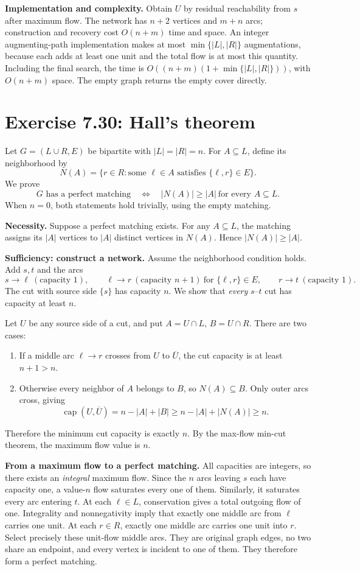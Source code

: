 \documentclass[11pt]{article}
\newcommand{\exercise}[2]{\section*{Exercise #1: #2}}
\newcommand{\capc}{\operatorname{cap}}
\begin{document}
\textbf{Implementation and complexity.}
Obtain $U$ by residual reachability from $s$ after maximum flow.
The network has $n+2$ vertices and $m+n$ arcs; construction and
recovery cost $O(n+m)$ time and space.
An integer augmenting-path implementation makes at most
$\min\{|L|,|R|\}$ augmentations, because each adds at least one unit
and the total flow is at most this quantity. Including the final search,
the time is $O((n+m)(1+\min\{|L|,|R|\}))$, with $O(n+m)$ space.
The empty graph returns the empty cover directly.

\newpage
\exercise{7.30}{Hall's theorem}
Let $G=(L\cup R,E)$ be bipartite with $|L|=|R|=n$. For
$A\subseteq L$, define its neighborhood by
\[
 N(A)=\{r\in R:\text{some $\ell\in A$ satisfies $\{\ell,r\}\in E$}\}.
\]
We prove
\[
 \boxed{\text{$G$ has a perfect matching}
 \quad\Longleftrightarrow\quad
 |N(A)|\ge|A|\ \text{for every }A\subseteq L.}
\]
When $n=0$, both statements hold trivially, using the empty matching.

\textbf{Necessity.}
Suppose a perfect matching exists. For any $A\subseteq L$, the
matching assigns its $|A|$ vertices to $|A|$ distinct vertices in
$N(A)$. Hence $|N(A)|\ge|A|$.

\textbf{Sufficiency: construct a network.}
Assume the neighborhood condition holds. Add $s,t$ and the arcs
\[
 s\to\ell\ (\text{capacity }1),\qquad
 \ell\to r\ (\text{capacity }n+1)\ \text{for }\{\ell,r\}\in E,
 \qquad r\to t\ (\text{capacity }1).
\]
The cut with source side $\{s\}$ has capacity $n$.
We show that \emph{every} $s$--$t$ cut has capacity at least $n$.

Let $U$ be any source side of a cut, and put
$A=U\cap L$, $B=U\cap R$. There are two cases:
\begin{enumerate}[label=(\roman*)]
 \item If a middle arc $\ell\to r$ crosses from $U$ to
       $\overline U$, the cut capacity is at least $n+1>n$.
 \item Otherwise every neighbor of $A$ belongs to $B$, so
       $N(A)\subseteq B$. Only outer arcs cross, giving
       \[
        \capc(U,\overline U)
        =n-|A|+|B|
        \ge n-|A|+|N(A)|
        \ge n.
       \]
\end{enumerate}
Therefore the minimum cut capacity is exactly $n$. By the
max-flow min-cut theorem, the maximum flow value is $n$.

\textbf{From a maximum flow to a perfect matching.}
All capacities are integers, so there exists an \emph{integral}
maximum flow. Since the $n$ arcs leaving $s$ each have capacity one,
a value-$n$ flow saturates every one of them. Similarly, it saturates
every arc entering $t$.
At each $\ell\in L$, conservation gives a total outgoing flow of
one. Integrality and nonnegativity imply that exactly one middle arc
from $\ell$ carries one unit. At each $r\in R$, exactly one middle
arc carries one unit into $r$.
Select precisely these unit-flow middle arcs. They are original
graph edges, no two share an endpoint, and every vertex is incident
to one of them. They therefore form a perfect matching.
\end{document}
